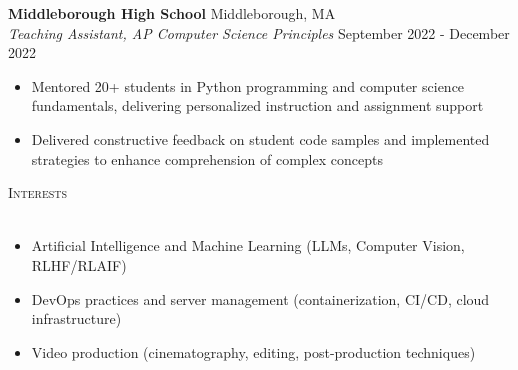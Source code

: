 \documentclass[a4paper, 10pt]{article}
\newcommand{\lineunder}{
    \vspace*{-8pt} \\
    \hspace*{-18pt} \hrulefill \\
}
\newcommand{\header}[1]{
    {\hspace*{-18pt}\vspace*{6pt} \textsc{#1}}
    \vspace*{-6pt} \lineunder
}
\begin{document}
\textbf{Middleborough High School} \hfill Middleborough, MA\\
\textit{Teaching Assistant, AP Computer Science Principles} \hfill September 2022 - December 2022
\begin{itemize}
    \item Mentored 20+ students in Python programming and computer science fundamentals, delivering personalized instruction and assignment support
    \item Delivered constructive feedback on student code samples and implemented strategies to enhance comprehension of complex concepts
\end{itemize}


\header{Interests}
\begin{itemize}
    \item Artificial Intelligence and Machine Learning (LLMs, Computer Vision, RLHF/RLAIF)
    \item DevOps practices and server management (containerization, CI/CD, cloud infrastructure)
    \item Video production (cinematography, editing, post-production techniques)
\end{itemize}
\end{document}
